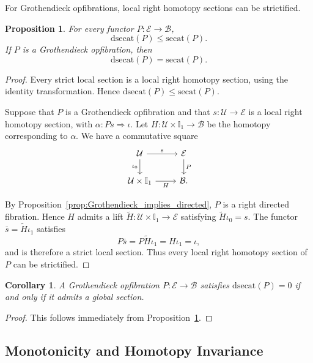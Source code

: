 \documentclass[12pt]{amsart}
\newtheorem{corollary}[teo]{Corollary}
\newtheorem{prop}[teo]{Proposition}
\theoremstyle{definition}
\theoremstyle{remark}
\numberwithin{figure}{section}%
\newcommand{\Ba}{\mathcal{B}}
\newcommand{\E}{\mathcal{E}}
\newcommand{\Uc}{\mathcal{U}}
\begin{document}
For Grothendieck opfibrations, local right homotopy sections can be
strictified.

\begin{prop}\label{prop:secat_dsecat_comparison}
For every functor \(P\colon\E\to\Ba\),
\[
\mathrm{dsecat}(P)\leq\mathrm{secat}(P).
\]
If \(P\) is a Grothendieck opfibration, then
\[
\mathrm{dsecat}(P)=\mathrm{secat}(P).
\]
\end{prop}

\begin{proof}
Every strict local section is a local right homotopy section, using the
identity transformation. Hence
\(\mathrm{dsecat}(P)\leq\mathrm{secat}(P)\).

Suppose that \(P\) is a Grothendieck opfibration and that
\(s\colon\Uc\to\E\) is a local right homotopy section, with
\(\alpha\colon P s\Rightarrow\iota\). Let
\(H\colon\Uc\times\mathbb I_1\to\Ba\) be the homotopy corresponding to
\(\alpha\). We have a commutative square
\[
\begin{tikzcd}
\Uc \arrow[r, "s"] \arrow[d, "\iota_0"'] &
\E \arrow[d, "P"] \\
\Uc\times\mathbb I_1 \arrow[r, "H"'] &
\Ba .
\end{tikzcd}
\]

By Proposition~\ref{prop:Grothendieck_implies_directed}, \(P\) is a right
directed fibration. Hence \(H\) admits a lift
\(\widetilde H\colon\Uc\times\mathbb I_1\to\E\) satisfying
\(\widetilde H\iota_0=s\). The functor
\(\overline{s}=\widetilde H\iota_1\) satisfies
\[
P\overline{s}
=
P\widetilde H\iota_1
=
H\iota_1
=
\iota,
\]
and is therefore a strict local section. Thus every local right homotopy
section of \(P\) can be strictified.
\end{proof}

\begin{corollary}\label{cor:dsecat_zero_opfibration}
A Grothendieck opfibration \(P\colon\E\to\Ba\) satisfies
\(\mathrm{dsecat}(P)\allowbreak=\allowbreak0\) if and only if it admits a global section.
\end{corollary}

\begin{proof}
This follows immediately from
Proposition~\ref{prop:secat_dsecat_comparison}.
\end{proof}

\subsection{Monotonicity and Homotopy Invariance}
\end{document}
